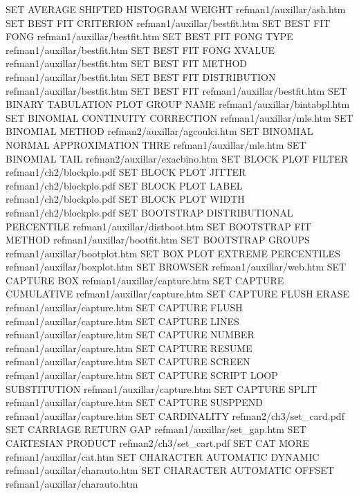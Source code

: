 SET AVERAGE SHIFTED HISTOGRAM WEIGHT    refman1/auxillar/ash.htm
SET BEST FIT CRITERION                  refman1/auxillar/bestfit.htm
SET BEST FIT FONG                       refman1/auxillar/bestfit.htm
SET BEST FIT FONG TYPE                  refman1/auxillar/bestfit.htm
SET BEST FIT FONG XVALUE                refman1/auxillar/bestfit.htm
SET BEST FIT METHOD                     refman1/auxillar/bestfit.htm
SET BEST FIT DISTRIBUTION               refman1/auxillar/bestfit.htm
SET BEST FIT                            refman1/auxillar/bestfit.htm
SET BINARY TABULATION PLOT GROUP NAME   refman1/auxillar/bintabpl.htm
SET BINOMIAL CONTINUITY CORRECTION      refman1/auxillar/mle.htm
SET BINOMIAL METHOD                     refman2/auxillar/agcoulci.htm
SET BINOMIAL NORMAL APPROXIMATION THRE  refman1/auxillar/mle.htm
SET BINOMIAL TAIL                       refman2/auxillar/exacbino.htm
SET BLOCK PLOT FILTER                   refman1/ch2/blockplo.pdf
SET BLOCK PLOT JITTER                   refman1/ch2/blockplo.pdf
SET BLOCK PLOT LABEL                    refman1/ch2/blockplo.pdf
SET BLOCK PLOT WIDTH                    refman1/ch2/blockplo.pdf
SET BOOTSTRAP DISTRIBUTIONAL PERCENTILE refman1/auxillar/distboot.htm
SET BOOTSTRAP FIT METHOD                refman1/auxillar/bootfit.htm
SET BOOTSTRAP GROUPS                    refman1/auxillar/bootplot.htm
SET BOX PLOT EXTREME PERCENTILES        refman1/auxillar/boxplot.htm
SET BROWSER                             refman1/auxillar/web.htm
SET CAPTURE BOX                         refman1/auxillar/capture.htm
SET CAPTURE CUMULATIVE                  refman1/auxillar/capture.htm
SET CAPTURE FLUSH ERASE                 refman1/auxillar/capture.htm
SET CAPTURE FLUSH                       refman1/auxillar/capture.htm
SET CAPTURE LINES                       refman1/auxillar/capture.htm
SET CAPTURE NUMBER                      refman1/auxillar/capture.htm
SET CAPTURE RESUME                      refman1/auxillar/capture.htm
SET CAPTURE SCREEN                      refman1/auxillar/capture.htm
SET CAPTURE SCRIPT LOOP SUBSTITUTION    refman1/auxillar/capture.htm
SET CAPTURE SPLIT                       refman1/auxillar/capture.htm
SET CAPTURE SUSPPEND                    refman1/auxillar/capture.htm
SET CARDINALITY                         refman2/ch3/set_card.pdf
SET CARRIAGE RETURN GAP                 refman1/auxillar/set_gap.htm
SET CARTESIAN PRODUCT                   refman2/ch3/set_cart.pdf
SET CAT MORE                            refman1/auxillar/cat.htm
SET CHARACTER AUTOMATIC DYNAMIC         refman1/auxillar/charauto.htm
SET CHARACTER AUTOMATIC OFFSET          refman1/auxillar/charauto.htm
